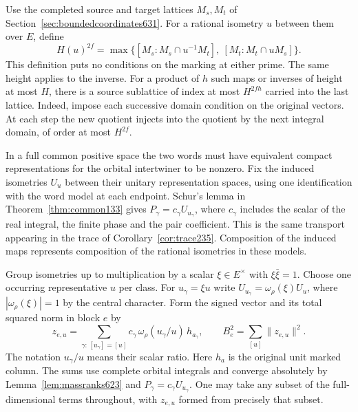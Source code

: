 \documentclass[a4paper,11pt]{article}
\theoremstyle{definition}
\theoremstyle{remark}
\numberwithin{equation}{section}
\begin{document}
Use the completed source and target lattices \(M_s,M_t\) of
Section~\ref{sec:boundedcoordinates631}. For a rational isometry
\(u\) between them over \(E\), define
\[
 H(u)^{2f}=
 \max\{[M_s:M_s\cap u^{-1}M_t],\
                     [M_t:M_t\cap u M_s]\}.
\]
This definition puts no conditions on the marking at either prime.
The same height applies to the inverse. For a product of \(h\) such
maps or inverses of height at most \(H\), there is a source sublattice
of index at most \(H^{2fh}\) carried into the last lattice. Indeed,
impose each successive domain condition on the original vectors.
At each step the new quotient injects into the quotient by the next
integral domain, of order at most \(H^{2f}\).

In a full common positive space the two words must have equivalent
compact representations for the orbital intertwiner to be nonzero.
Fix the induced isometries \(U_u\) between their unitary representation
spaces, using one identification with the word model at each endpoint.
Schur's lemma in Theorem~\ref{thm:common133} gives
\(P_\gamma=c_\gamma U_{u_\gamma}\), where \(c_\gamma\) includes
the scalar of the real integral, the finite phase and the pair
coefficient. This is the same transport appearing in the trace of
Corollary~\ref{cor:trace235}. Composition of the induced maps
represents composition of the rational isometries in these models.

Group isometries up to multiplication by a scalar \(\xi\in E^\times\)
with \(\xi\bar\xi=1\). Choose one occurring representative \(u\)
per class. For \(u_\gamma=\xi u\) write
\(U_{u_\gamma}=\omega_\rho(\xi) U_u\), where
\(|\omega_\rho(\xi)|=1\) by the central character. Form the signed
vector and its total squared norm in block \(e\) by
\[
       z_{e,u}=\sum_{\gamma:\,[u_\gamma]=[u]}
            c_\gamma\,\omega_\rho(u_\gamma/u)\,h_{a_\gamma},
       \qquad
       B_e^2=\sum_{[u]}\|z_{e,u}\|^2 .
\]
The notation \(u_\gamma/u\) means their scalar ratio. Here \(h_a\)
is the original unit marked column. The sums use complete orbital
integrals and converge absolutely by Lemma~\ref{lem:massranks623}
and \(P_\gamma=c_\gamma U_{u_\gamma}\). One may take any subset
of the full-dimensional terms throughout, with \(z_{e,u}\)
formed from precisely that subset.
\end{document}

